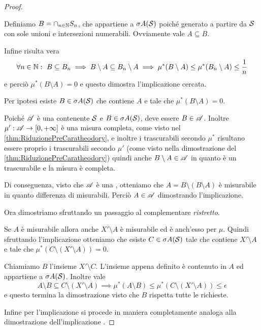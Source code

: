 \begin{proof}
\begin{description}
		Definiamo $B=\cap_{n\in\N}S_n$, che appartiene a $\sigma A(\S)$ poiché generato a partire da $\S$ con sole unioni e intersezioni numerabili. Ovviamente vale $A\subseteq B$.
		
		Infine risulta vera 
		\begin{equation*}
			\forall n\in\N:\ B\subseteq B_n\implies B\setminus A\subseteq B_n\setminus A\implies \mu^*(B\setminus A)\le \mu^*(B_n\setminus A)\le \frac1n
		\end{equation*}
		e perciò $\mu^*(B\setminus A)=0$ e questo dimostra l'implicazione cercata.
		\item[\ImplicationProof{it:SigmaDaFuoriEquivalenze}{it:MisurabileEquivalenze}] Per ipotesi esiste $B\in\sigma A(\S)$ che contiene $A$ e tale che $\mu^*(B\setminus A)=0$.
		
		Poiché $\A$ è una \sigalg{} contenente $\S$ e $B\in\sigma A(\S)$, deve essere $B\in\A$. 
		Inoltre $\mu':\A\to\Rpiu$ è una misura completa, come visto nel \cref{thm:RiduzionePreCaratheodory}, e inoltre i trascurabili secondo $\mu^*$ risultano essere proprio i trascurabili secondo $\mu'$ (come visto nella dimostrazione del \cref{thm:RiduzionePreCaratheodory}) quindi anche $B\setminus A\in \A$ in quanto è un trascurabile e la misura è completa. 
		
		Di conseguenza, visto che $\A$ è una \sigalg, otteniamo che $A=B\setminus (B\setminus A)$ è misurabile in quanto differenza di misurabili. Perciò $A\in\A$ dimostrando l'implicazione.
	\end{description}
	
	Ora dimostriamo  sfruttando un passaggio al complementare \emph{ristretto}.
	
	Se $A$ è misurabile allora anche $X'\setminus A$ è misurabile ed è anch'esso \sigfin[o] per $\mu$. Quindi sfruttando l'implicazione  otteniamo che esiste $C\in\sigma A(\S)$ tale che contiene $X'\setminus A$ e tale che $\mu^*(C\setminus(X'\setminus A))=0$. 
	
	Chiamiamo $B$ l'insieme $X'\setminus C$. L'insieme appena definito è contenuto in $A$ ed appartiene a $\sigma A(\S)$. Inoltre vale
	\begin{equation*}
		A\setminus B\subseteq C\setminus (X'\setminus A) \implies \mu^*(A\setminus B)\le \mu^*\left(C\setminus(X'\setminus A)\right)\le \epsilon
	\end{equation*}
	e questo termina la dimostrazione visto che $B$ rispetta tutte le richieste.
	
	Infine per l'implicazione  si procede in maniera completamente analoga alla dimostrazione dell'implicazione .
\end{proof}


